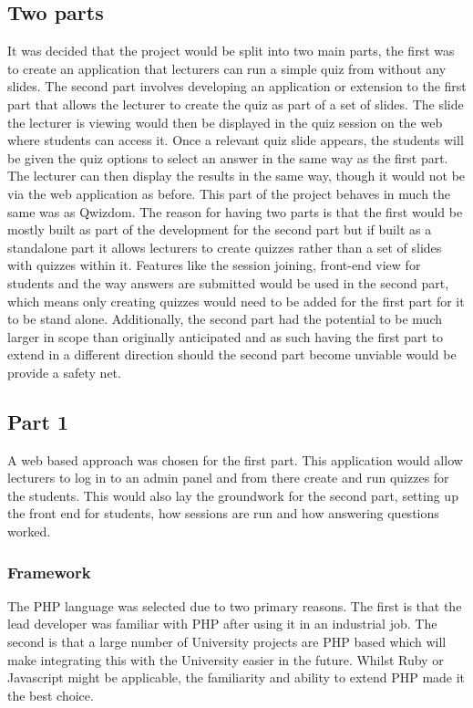 \subsection{Two parts}
It was decided that the project would be split into two main parts, the first was to create an application that lecturers can run a simple quiz from without any slides. The second part involves developing an application or extension to the first part that allows the lecturer to create the quiz as part of a set of slides. The slide the lecturer is viewing would then be displayed in the quiz session on the web where students can access it. Once a relevant quiz slide appears, the students will be given the quiz options to select an answer in the same way as the first part. The lecturer can then display the results in the same way, though it would not be via the web application as before. This part of the project behaves in much the same was as Qwizdom.
The reason for having two parts is that the first would be mostly built as part of the development for the second part but if built as a standalone part it allows lecturers to create quizzes rather than a set of slides with quizzes within it. Features like the session joining, front-end view for students and the way answers are submitted would be used in the second part, which means only creating quizzes would need to be added for the first part for it to be stand alone. Additionally, the second part had the potential to be much larger in scope than originally anticipated and as such having the first part to extend in a different direction should the second part become unviable would be provide a safety net.

\subsection{Part 1}
A web based approach was chosen for the first part. This application would allow lecturers to log in to an admin panel and from there create and run quizzes for the students. This would also lay the groundwork for the second part, setting up the front end for students, how sessions are run and how answering questions worked. 
\subsubsection{Framework}
The PHP language was selected due to two primary reasons. The first is that the lead developer was familiar with PHP after using it in an industrial job. The second is that a large number of University projects are PHP based which will make integrating this with the University easier in the future. Whilst Ruby or Javascript might be applicable, the familiarity and ability to extend PHP made it the best choice.
